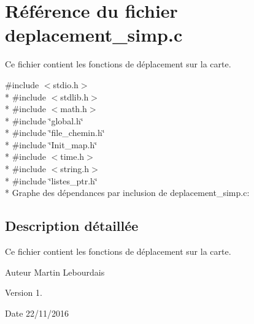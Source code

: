 \hypertarget{a00003}{}\section{Référence du fichier deplacement\+\_\+simp.\+c}
\label{a00003}


Ce fichier contient les fonctions de déplacement sur la carte.  


{\ttfamily \#include $<$stdio.\+h$>$}\\*
{\ttfamily \#include $<$stdlib.\+h$>$}\\*
{\ttfamily \#include $<$math.\+h$>$}\\*
{\ttfamily \#include \char`\"{}global.\+h\char`\"{}}\\*
{\ttfamily \#include \char`\"{}file\+\_\+chemin.\+h\char`\"{}}\\*
{\ttfamily \#include \char`\"{}Init\+\_\+map.\+h\char`\"{}}\\*
{\ttfamily \#include $<$time.\+h$>$}\\*
{\ttfamily \#include $<$string.\+h$>$}\\*
{\ttfamily \#include \char`\"{}listes\+\_\+ptr.\+h\char`\"{}}\\*
Graphe des dépendances par inclusion de deplacement\+\_\+simp.\+c\+:


\subsection{Description détaillée}
Ce fichier contient les fonctions de déplacement sur la carte. 

\begin{DoxyAuthor}{Auteur}
Martin Lebourdais 
\end{DoxyAuthor}
\begin{DoxyVersion}{Version}
1. 
\end{DoxyVersion}
\begin{DoxyDate}{Date}
22/11/2016 
\end{DoxyDate}
